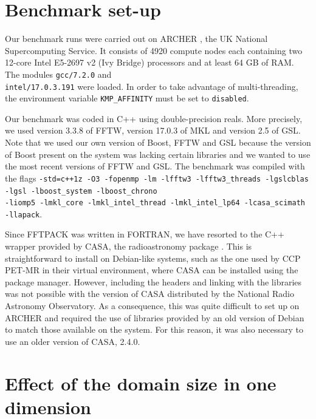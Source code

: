\documentclass[12pt, a4paper]{article}
\begin{document}
\section{Benchmark set-up}
Our benchmark runs were carried out on ARCHER \cite{archer}, the UK National Supercomputing Service. 
It consists of 4920 compute nodes each containing  two 12-core Intel E5-2697 v2 (Ivy Bridge) 
processors and at least 64 GB of RAM. The modules \texttt{gcc/7.2.0} and \\ \texttt{intel/17.0.3.191} 
were loaded. In order to take advantage of multi-threading, the environment variable \texttt{KMP\_AFFINITY} 
must be set to \texttt{disabled}.

Our benchmark was coded in C++ using double-precision reals. More precisely, we used version 3.3.8 
of FFTW, version 17.0.3 of MKL and version 2.5 of GSL. Note that we used our own version of Boost, 
FFTW and GSL because the version of Boost present on the system was lacking certain libraries and 
we wanted to use the most recent versions of FFTW and GSL. The benchmark was compiled with the flags
 \texttt{-std=c++1z -O3  -fopenmp   -lm -lfftw3 -lfftw3\_threads -lgslcblas -lgsl -lboost\_system -lboost\_chrono\\-liomp5 -lmkl\_core -lmkl\_intel\_thread -lmkl\_intel\_lp64  -lcasa\_scimath \\-llapack}.

Since FFTPACK was written in FORTRAN, we have resorted to the C++ wrapper provided by CASA, the 
radioastronomy package \cite{casa}. This is straightforward to install on Debian-like systems, 
such as the one used by CCP PET-MR in their virtual environment, where CASA can be installed 
using the package manager. However, including the headers and linking with the libraries was 
not possible with the version of CASA distributed by the National Radio Astronomy Observatory. 
As a consequence, this was quite difficult to set up on ARCHER and required the use of libraries 
provided by an old version of Debian to match those available on the system. For this reason, it 
was also necessary to use an older version of CASA, 2.4.0.


\section{Effect of the domain size in one dimension}\label{PERFORMANCE1D}
\end{document}
